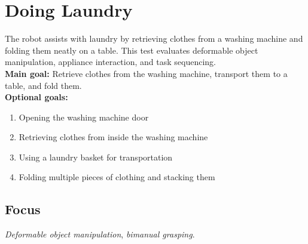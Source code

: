 \section{Doing Laundry}\label{test:doing-laundry}
The robot assists with laundry by retrieving clothes from a washing machine and folding them neatly on a table. This test evaluates deformable object manipulation, appliance interaction, and task sequencing.\\

\noindent \textbf{Main goal:} Retrieve clothes from the washing machine, transport them to a table, and fold them.\\

\noindent \textbf{Optional goals:}
\begin{enumerate}[nosep]
    \item Opening the washing machine door
	\item Retrieving clothes from inside the washing machine
    \item Using a laundry basket for transportation
    \item Folding multiple pieces of clothing and stacking them
\end{enumerate}

\subsection*{Focus}
\emph{Deformable object manipulation}, \emph{bimanual grasping}.

